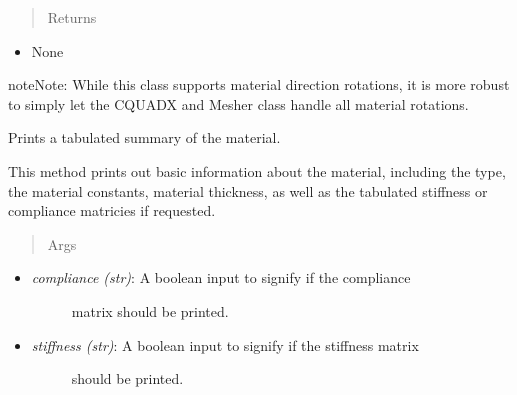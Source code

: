 \documentclass[letterpaper,10pt,english]{sphinxmanual}
\begin{document}
\begin{fulllineitems}
\begin{fulllineitems}
\begin{itemize}
\end{itemize}
\begin{quote}\begin{description}
\item[{Returns}] \leavevmode
\end{description}\end{quote}
\begin{itemize}
\item {} 
None

\end{itemize}

\begin{notice}{note}{Note:}
While this class supports material direction rotations, it is more
robust to simply let the CQUADX and Mesher class handle all material
rotations.
\end{notice}

\end{fulllineitems}


\begin{fulllineitems}
\label{structures:AeroComBAT.Structures.Material.printSummary}
Prints a tabulated summary of the material.

This method prints out basic information about the
material, including the type, the material constants, material
thickness, as well as the tabulated stiffness or compliance
matricies if requested.
\begin{quote}\begin{description}
\item[{Args}] \leavevmode
\end{description}\end{quote}
\begin{itemize}
\item {} \begin{description}
\item[{\emph{compliance (str)}: A boolean input to signify if the compliance}] \leavevmode
matrix should be printed.

\end{description}

\item {} \begin{description}
\item[{\emph{stiffness (str)}: A boolean input to signify if the stiffness matrix}] \leavevmode
should be printed.


\end{description}
\end{itemize}
\end{fulllineitems}
\end{fulllineitems}
\end{document}

